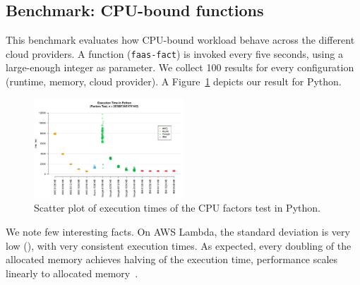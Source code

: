 \subsection{Benchmark: CPU-bound functions}
\label{sec:general_test}
This benchmark evaluates how CPU-bound workload behave across the different cloud providers.
A function (\texttt{faas-fact}) is invoked every five seconds, using a large-enough integer as parameter. 
We collect 100 results for every configuration (runtime, memory, cloud provider).
A%
Figure~\ref{fig:general_python_plot} depicts our result for Python.

\begin{figure}[!t]
\begin{center}
\includegraphics[width=0.5\textwidth]{bilder/general_python/scatterplot_general_python.pdf}
\caption{Scatter plot of execution times of the \gls{CPU} factors test in Python.}
\label{fig:general_python_plot}
\end{center}
\end{figure}

We note few interesting facts.
On \gls{AWS} Lambda, the standard deviation is very low (), with very consistent execution times. 
As expected, every doubling of the allocated memory achieves halving of the execution time, performance scales linearly to allocated memory~\cite{AWSLambdaConfig}. 

